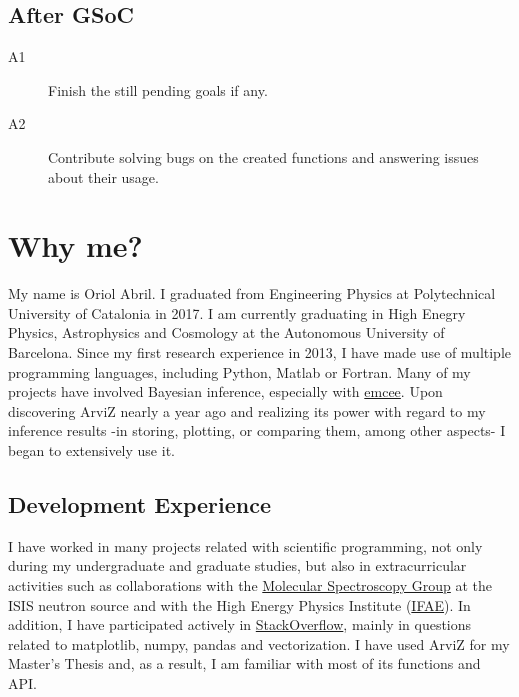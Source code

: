 \documentclass{article}
\begin{document}
\subsection{\texorpdfstring{\textbf{After
GSoC}}{After Google Summer of Code}}\label{after-gsoc}

\begin{description}
\item[A1] Finish the still pending goals if any.
\item[A2] Contribute solving bugs on the created functions and answering
  issues about their usage.
\end{description}

\section{Why me?}\label{why-me}

My name is Oriol Abril. I graduated from Engineering Physics at
Polytechnical University of Catalonia in 2017. I am currently graduating
in High Enegry Physics, Astrophysics and Cosmology at the Autonomous
University of Barcelona. Since my first research experience in 2013, I
have made use of multiple programming languages, including Python,
Matlab or Fortran. Many of my projects have involved Bayesian inference,
especially with \href{https://emcee.readthedocs.io/en/latest/}{emcee}.
Upon discovering ArviZ nearly a year ago and realizing its power with
regard to my inference results -in storing, plotting, or comparing them,
among other aspects- I began to extensively use it.

\subsection{Development Experience}\label{development-experience}

I have worked in many projects related with scientific programming, not
only during my undergraduate and graduate studies, but also in
extracurricular activities such as collaborations with the
\href{https://www.isis.stfc.ac.uk/Pages/Molecular-Spectroscopy.aspx}{Molecular
Spectroscopy Group} at the ISIS neutron source and with the High Energy
Physics Institute (\href{http://www.ifae.es/eng/}{IFAE}). In addition, I
have participated actively in
\href{https://stackoverflow.com/users/2504700/xg-plt-py}{StackOverflow},
mainly in questions related to matplotlib, numpy, pandas and
vectorization. I have used ArviZ for my Master's Thesis and, as a
result, I am familiar with most of its functions and API.
\end{document}
